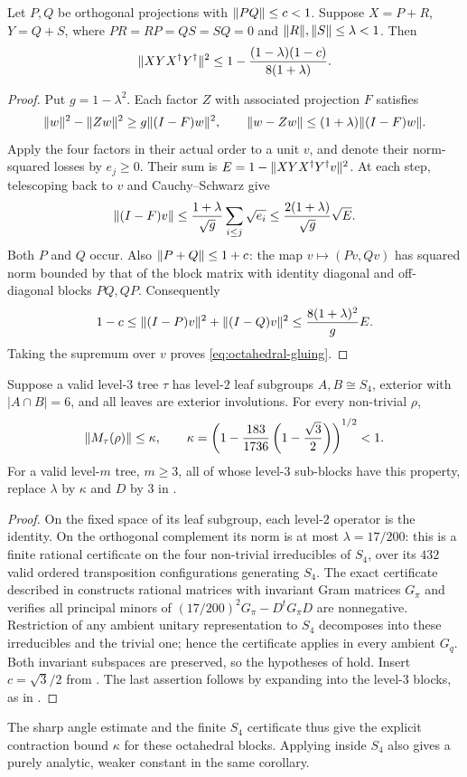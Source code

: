 \begin{lemma}
\label{lem:octahedral-gluing}
Let $P,Q$ be orthogonal projections with $\lVert PQ \rVert\le c<1$. Suppose
$X=P+R$, $Y=Q+S$, where
$PR=RP=QS=SQ=0$ and $\lVert R \rVert,\lVert S \rVert\le\lambda<1$. Then
\begin{equation}\label{eq:octahedral-gluing}
 \lVert XYX^\dagger Y^\dagger \rVert^2
 \le1-\frac{(1-\lambda)(1-c)}{8(1+\lambda)}.
\end{equation}
\end{lemma}
\begin{proof}
Put $g=1-\lambda^2$. Each factor $Z$ with associated projection $F$
satisfies
\[
 \lVert w \rVert^2-\lVert Zw \rVert^2\ge g\lVert (I-F)w \rVert^2,
 \qquad \lVert w-Zw \rVert\le(1+\lambda)\lVert (I-F)w \rVert.
\]
Apply the four factors in their actual order to a unit $v$, and denote
their norm-squared losses by $e_j\ge0$. Their sum is
$E=1-\lVert XYX^\dagger Y^\dagger v \rVert^2$.
At each step, telescoping back to $v$ and Cauchy--Schwarz give
\[
 \lVert (I-F)v \rVert\le\frac{1+\lambda}{\sqrt g}
             \sum_{i\le j}\sqrt{e_i}
       \le\frac{2(1+\lambda)}{\sqrt g}\sqrt E.
\]
Both $P$ and $Q$ occur. Also $\lVert P+Q \rVert\le1+c$: the map
$v\mapsto(Pv,Qv)$ has squared norm bounded by that of the block matrix
with identity diagonal and off-diagonal blocks $PQ,QP$.
Consequently
\[
 1-c\le\lVert (I-P)v \rVert^2+\lVert (I-Q)v \rVert^2
       \le\frac{8(1+\lambda)^2}{g}E.
\]
Taking the supremum over $v$ proves \eqref{eq:octahedral-gluing}.
\end{proof}

\begin{corollary}
\label{cor:octahedral-block}
Suppose a valid level-$3$ tree $\tau$ has level-$2$ leaf subgroups
$A,B\cong S_4$, exterior with $|A\cap B|=6$, and all leaves are exterior
involutions. For every non-trivial $\rho$,
\[
 \lVert M_\tau(\rho) \rVert\le\kappa,
 \qquad
 \kappa=\left(1-\frac{183}{1736}
                       \left(1-\frac{\sqrt3}{2}\right)\right)^{1/2}<1.
\]
For a valid level-$m$ tree, $m\ge3$, all of whose level-$3$ sub-blocks
have this property, replace $\lambda$ by $\kappa$ and $D$ by $3$ in
.
\end{corollary}
\begin{proof}
On the fixed space of its leaf subgroup, each level-$2$ operator is the
identity. On the orthogonal complement its norm is at most
$\lambda=17/200$: this is a finite rational certificate on the four
non-trivial irreducibles of $S_4$, over its $432$ valid ordered
transposition configurations generating $S_4$. The exact certificate
described in  constructs rational matrices with
invariant Gram matrices $G_\pi$ and verifies all principal minors of
$(17/200)^2G_\pi-D^tG_\pi D$ are nonnegative. Restriction of any ambient
unitary representation to $S_4$ decomposes into these irreducibles and
the trivial one; hence the certificate applies in every ambient $G_q$.
Both invariant subspaces are preserved, so the hypotheses of
 hold. Insert $c=\sqrt3/2$ from
. The last assertion follows by expanding
into the level-$3$ blocks, as in .
\end{proof}

The sharp angle estimate and the finite $S_4$ certificate thus give the
explicit contraction bound $\kappa$ for these octahedral blocks. Applying
 inside $S_4$ also gives a purely analytic, weaker
constant in the same corollary.
